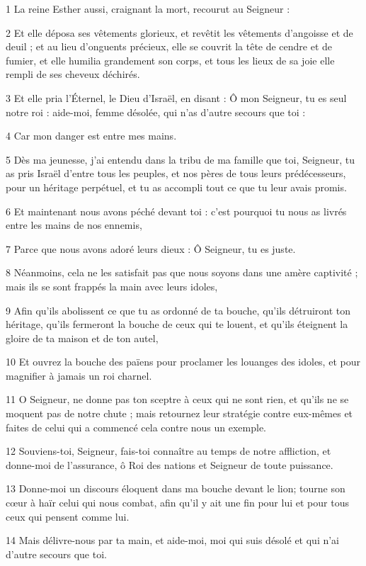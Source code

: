 \par 1 La reine Esther aussi, craignant la mort, recourut au Seigneur :
\par 2 Et elle déposa ses vêtements glorieux, et revêtit les vêtements d'angoisse et de deuil ; et au lieu d'onguents précieux, elle se couvrit la tête de cendre et de fumier, et elle humilia grandement son corps, et tous les lieux de sa joie elle rempli de ses cheveux déchirés.
\par 3 Et elle pria l'Éternel, le Dieu d'Israël, en disant : Ô mon Seigneur, tu es seul notre roi : aide-moi, femme désolée, qui n'as d'autre secours que toi :
\par 4 Car mon danger est entre mes mains.
\par 5 Dès ma jeunesse, j'ai entendu dans la tribu de ma famille que toi, Seigneur, tu as pris Israël d'entre tous les peuples, et nos pères de tous leurs prédécesseurs, pour un héritage perpétuel, et tu as accompli tout ce que tu leur avais promis.
\par 6 Et maintenant nous avons péché devant toi : c'est pourquoi tu nous as livrés entre les mains de nos ennemis,
\par 7 Parce que nous avons adoré leurs dieux : Ô Seigneur, tu es juste.
\par 8 Néanmoins, cela ne les satisfait pas que nous soyons dans une amère captivité ; mais ils se sont frappés la main avec leurs idoles,
\par 9 Afin qu'ils abolissent ce que tu as ordonné de ta bouche, qu'ils détruiront ton héritage, qu'ils fermeront la bouche de ceux qui te louent, et qu'ils éteignent la gloire de ta maison et de ton autel,
\par 10 Et ouvrez la bouche des païens pour proclamer les louanges des idoles, et pour magnifier à jamais un roi charnel.
\par 11 O Seigneur, ne donne pas ton sceptre à ceux qui ne sont rien, et qu'ils ne se moquent pas de notre chute ; mais retournez leur stratégie contre eux-mêmes et faites de celui qui a commencé cela contre nous un exemple.
\par 12 Souviens-toi, Seigneur, fais-toi connaître au temps de notre affliction, et donne-moi de l'assurance, ô Roi des nations et Seigneur de toute puissance.
\par 13 Donne-moi un discours éloquent dans ma bouche devant le lion; tourne son cœur à haïr celui qui nous combat, afin qu'il y ait une fin pour lui et pour tous ceux qui pensent comme lui.
\par 14 Mais délivre-nous par ta main, et aide-moi, moi qui suis désolé et qui n'ai d'autre secours que toi.
